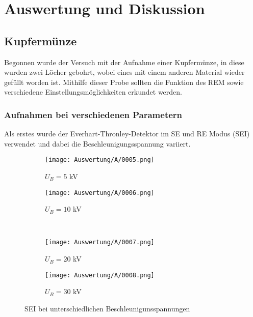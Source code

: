 
\chapter{Auswertung und Diskussion}
\label{chap:versuchsauswertung}

\section{Kupfermünze}
Begonnen wurde der Versuch mit der Aufnahme einer Kupfermünze, in diese wurden zwei Löcher gebohrt, wobei eines mit einem anderen Material wieder gefüllt worden ist. Mithilfe dieser Probe sollten die Funktion des REM sowie verschiedene Einstellungsmöglichkeiten erkundet werden.

\newpage
\subsection*{Aufnahmen bei verschiedenen Parametern}
Als erstes wurde der Everhart-Thronley-Detektor im SE und RE Modus (SEI) verwendet und dabei die Beschleunigungsspannung variiert.

\begin{figure}[h]
    \centering
    
    \begin{subfigure}[b]{0.45\textwidth}
        \centering
        \texttt{[image: Auswertung/A/0005.png]}
        \caption{$U_B = 5$ kV}
    \end{subfigure}
    \hfill
    \begin{subfigure}[b]{0.45\textwidth}
        \centering
        \texttt{[image: Auswertung/A/0006.png]}
        \caption{$U_B = 10$ kV}
    \end{subfigure}
    \\
    \begin{subfigure}[b]{0.45\textwidth}
        \centering
        \texttt{[image: Auswertung/A/0007.png]}
        \caption{$U_B = 20$ kV}
    \end{subfigure}
    \hfill
    \begin{subfigure}[b]{0.45\textwidth}
        \centering
        \texttt{[image: Auswertung/A/0008.png]}
        \caption{$U_B = 30$ kV}
    \end{subfigure}
    \caption{SEI bei unterschiedlichen Beschleunigunsspannungen}
\end{figure}

